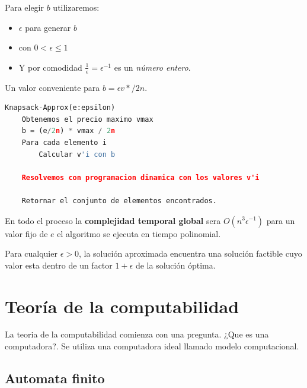 \documentclass{article}
\begin{document}
Para elegir \(b\) utilizaremos:
\begin{itemize}
    \item \(\epsilon\) para generar \(b\)
    \item con \(0 < \epsilon \leq 1\)
    \item Y por comodidad \(\frac{1}{\epsilon}=\epsilon^{-1}\) es un \textit{número entero}.
\end{itemize}
Un valor conveniente para \(b=\epsilon v* / 2n\).


\begin{lstlisting}[language=Python, caption=Knapsack-Approx(e:epsilon)]
Knapsack-Approx(e:epsilon)
    Obtenemos el precio maximo vmax
    b = (e/2n) * vmax / 2n
    Para cada elemento i
        Calcular v'i con b

    Resolvemos con programacion dinamica con los valores v'i

    Retornar el conjunto de elementos encontrados.

\end{lstlisting}   

En todo el proceso la \textbf{complejidad temporal global} sera \(O(n^3\epsilon^{-1})\) para un valor
fijo de \(e\) el algoritmo se ejecuta en tiempo polinomial.

Para cualquier \( \epsilon > 0 \), la solución aproximada encuentra una solución factible cuyo
valor esta dentro de un factor \(1+\epsilon\) de la solución óptima.


\newpage
\section{Teoría de la computabilidad}
La teoria de la computabilidad comienza con una pregunta. ¿Que es una computadora?. Se utiliza una
computadora ideal llamado modelo computacional.

\subsection{Automata finito}
\end{document}
